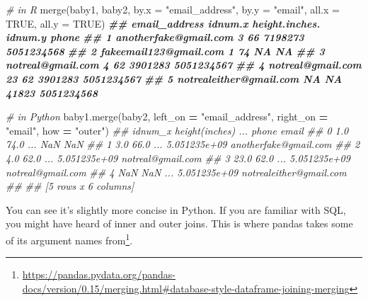 \documentclass[
  12pt,
]{krantz}
\makeatletter
\newenvironment{Shaded}{\begin{snugshade}}{\end{snugshade}}
\newcommand{\AttributeTok}[1]{\textcolor[rgb]{0.61,0.61,0.61}{#1}}
\newcommand{\CommentTok}[1]{\textcolor[rgb]{0.37,0.37,0.37}{\textit{#1}}}
\newcommand{\ConstantTok}[1]{\textcolor[rgb]{0,0,0}{#1}}
\newcommand{\DocumentationTok}[1]{\textcolor[rgb]{0.37,0.37,0.37}{\textbf{\textit{#1}}}}
\newcommand{\FunctionTok}[1]{\textcolor[rgb]{0,0,0}{#1}}
\newcommand{\NormalTok}[1]{#1}
\newcommand{\OperatorTok}[1]{\textcolor[rgb]{0.43,0.43,0.43}{\textbf{#1}}}
\newcommand{\StringTok}[1]{\textcolor[rgb]{0.5,0.5,0.5}{#1}}
\renewcommand{\href}[2]{#2\footnote{\url{#1}}}
\newenvironment{kframe}{%
\medskip{}
\setlength{\fboxsep}{.8em}
 \def\at@end@of@kframe{}%
 \ifinner\ifhmode%
  \def\at@end@of@kframe{\end{minipage}}%
  \begin{minipage}{\columnwidth}%
 \fi\fi%
 \def\FrameCommand##1{\hskip\@totalleftmargin \hskip-\fboxsep
 \colorbox{shadecolor}{##1}\hskip-\fboxsep
     \hskip-\linewidth \hskip-\@totalleftmargin \hskip\columnwidth}%
 \MakeFramed {\advance\hsize-\width
   \@totalleftmargin\z@ \linewidth\hsize
   \@setminipage}}%
 {\par\unskip\endMakeFramed%
 \at@end@of@kframe}
\renewenvironment{Shaded}{\begin{kframe}}{\end{kframe}}
\makeatother
\begin{document}
\begin{Shaded}
\begin{Highlighting}[]
\CommentTok{\# in R}
\FunctionTok{merge}\NormalTok{(baby1, baby2, }
      \AttributeTok{by.x =} \StringTok{"email\_address"}\NormalTok{, }\AttributeTok{by.y =} \StringTok{"email"}\NormalTok{, }
      \AttributeTok{all.x =} \ConstantTok{TRUE}\NormalTok{, }\AttributeTok{all.y =} \ConstantTok{TRUE}\NormalTok{)}
\DocumentationTok{\#\#             email\_address idnum.x height.inches. idnum.y      phone}
\DocumentationTok{\#\# 1   anotherfake@gmail.com       3             66 7198273 5051234568}
\DocumentationTok{\#\# 2  fakeemail123@gmail.com       1             74      NA         NA}
\DocumentationTok{\#\# 3       notreal@gmail.com       4             62 3901283 5051234567}
\DocumentationTok{\#\# 4       notreal@gmail.com      23             62 3901283 5051234567}
\DocumentationTok{\#\# 5 notrealeither@gmail.com      NA             NA   41823 5051234568}
\end{Highlighting}
\end{Shaded}

\begin{Shaded}
\begin{Highlighting}[]
\CommentTok{\# in Python}
\NormalTok{baby1.merge(baby2, }
\NormalTok{            left\_on }\OperatorTok{=} \StringTok{"email\_address"}\NormalTok{, right\_on }\OperatorTok{=} \StringTok{"email"}\NormalTok{, }
\NormalTok{            how }\OperatorTok{=} \StringTok{"outer"}\NormalTok{)}
\CommentTok{\#\#    idnum\_x  height(inches)  ...         phone                    email}
\CommentTok{\#\# 0      1.0            74.0  ...           NaN                      NaN}
\CommentTok{\#\# 1      3.0            66.0  ...  5.051235e+09    anotherfake@gmail.com}
\CommentTok{\#\# 2      4.0            62.0  ...  5.051235e+09        notreal@gmail.com}
\CommentTok{\#\# 3     23.0            62.0  ...  5.051235e+09        notreal@gmail.com}
\CommentTok{\#\# 4      NaN             NaN  ...  5.051235e+09  notrealeither@gmail.com}
\CommentTok{\#\# }
\CommentTok{\#\# [5 rows x 6 columns]}
\end{Highlighting}
\end{Shaded}

You can see it's slightly more concise in Python. If you are familiar with SQL, you might have heard of inner and outer joins. This is where pandas \href{https://pandas.pydata.org/pandas-docs/version/0.15/merging.html\#database-style-dataframe-joining-merging}{takes some of its argument names from}.
\end{document}
